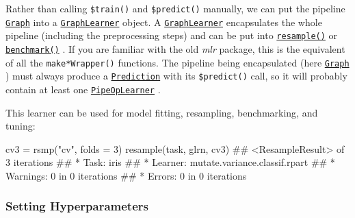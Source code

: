 \documentclass[]{article}
\newenvironment{Shaded}{}{}
\newcommand{\DataTypeTok}[1]{#1}
\newcommand{\DecValTok}[1]{#1}
\newcommand{\KeywordTok}[1]{\textcolor[rgb]{0.00,0.00,1.00}{#1}}
\newcommand{\NormalTok}[1]{#1}
\newcommand{\OperatorTok}[1]{#1}
\newcommand{\StringTok}[1]{\textcolor[rgb]{0.00,0.50,0.50}{#1}}
\renewenvironment{Shaded} {\begin{snugshade}\small} {\end{snugshade}}
\begin{document}
Rather than calling \texttt{\$train()} and \texttt{\$predict()} manually, we can put the pipeline \href{https://mlr3pipelines.mlr-org.com/reference/Graph.html}{\texttt{Graph}} into a \href{https://mlr3pipelines.mlr-org.com/reference/mlr_learners_graph.html}{\texttt{GraphLearner}} object.
A \href{https://mlr3pipelines.mlr-org.com/reference/mlr_learners_graph.html}{\texttt{GraphLearner}} encapsulates the whole pipeline (including the preprocessing steps) and can be put into \href{https://mlr3.mlr-org.com/reference/resample.html}{\texttt{resample()}} or \href{https://mlr3.mlr-org.com/reference/benchmark.html}{\texttt{benchmark()}} .
If you are familiar with the old \emph{mlr} package, this is the equivalent of all the \texttt{make*Wrapper()} functions.
The pipeline being encapsulated (here \href{https://mlr3pipelines.mlr-org.com/reference/Graph.html}{\texttt{Graph}} ) must always produce a \href{https://mlr3.mlr-org.com/reference/Prediction.html}{\texttt{Prediction}} with its \texttt{\$predict()} call, so it will probably contain at least one \href{https://mlr3pipelines.mlr-org.com/reference/mlr_pipeops_learner.html}{\texttt{PipeOpLearner}} .

\begin{Shaded}
\end{Shaded}

This learner can be used for model fitting, resampling, benchmarking, and tuning:

\begin{Shaded}
\begin{Highlighting}[]
\NormalTok{cv3 =}\StringTok{ }\KeywordTok{rsmp}\NormalTok{(}\StringTok{"cv"}\NormalTok{, }\DataTypeTok{folds =} \DecValTok{3}\NormalTok{)}
\KeywordTok{resample}\NormalTok{(task, glrn, cv3)}
\NormalTok{## <ResampleResult> of 3 iterations}
\NormalTok{## * Task: iris}
\NormalTok{## * Learner: mutate.variance.classif.rpart}
\NormalTok{## * Warnings: 0 in 0 iterations}
\NormalTok{## * Errors: 0 in 0 iterations}
\end{Highlighting}
\end{Shaded}

\hypertarget{pipe-hyperpars}{%
\subsubsection{Setting Hyperparameters}\label{pipe-hyperpars}}
\end{document}
